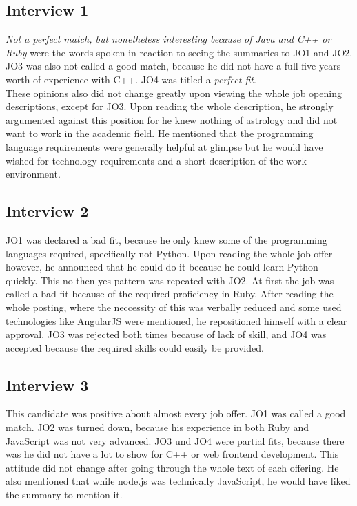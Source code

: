 \subsection{Interview 1}
\textit{Not a perfect match, but nonetheless interesting because of Java and C++ or Ruby} were the words spoken in reaction to seeing the summaries to JO1 and JO2.
JO3 was also not called a good match, because he did not have a
full five years worth of experience with C++. JO4 was titled a \textit{perfect fit}.\\
These opinions also did not change greatly upon viewing the whole job opening
descriptions, except for JO3. Upon reading the whole description, he strongly
argumented against this position for he knew nothing of astrology and did not want
to work in the academic field. He mentioned that the programming language requirements
were generally helpful at glimpse but he would have wished for technology requirements
and a short description of the work environment.

\subsection{Interview 2}
JO1 was declared a bad fit, because he only knew some of the programming languages
required, specifically not Python. Upon reading the whole job offer however, he
announced that he could do it because he could learn Python quickly.
This no-then-yes-pattern was repeated with JO2. At first the job was called a bad fit
because of the required proficiency in Ruby. After reading the whole posting,
where the neccessity of this was verbally reduced and some used
technologies like AngularJS were mentioned, he repositioned himself
with a clear approval.
JO3 was rejected both times because of lack of skill, and
JO4 was accepted because the required skills could easily be provided.

\subsection{Interview 3}
This candidate was positive about almost every job offer. JO1 was called
a good match. JO2 was turned down, because his experience in both Ruby
and JavaScript was not very advanced. JO3 und JO4 were partial fits,
because there was he did not have a lot to show for C++ or web frontend development.
This attitude did not change after going through the whole text of each offering.
He also mentioned that while node.js was technically JavaScript, he would have
liked the summary to mention it.

